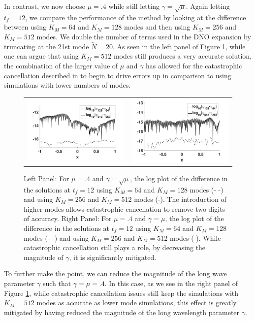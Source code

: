 \documentclass[a4paper,11pt]{article}
\begin{document}
In contrast, we now choose $\mu=.4$ while still letting $\gamma=\sqrt{\mu}$.  Again letting $t_{f} =12$, we compare the performance of the method by looking at the difference between using $K_{M}=64$ and $K_{M}=128$ modes and then using $K_{M}=256$ and $K_{M}=512$ modes.  We double the number of terms used in the DNO expansion by truncating at the 21st mode $\tilde{N}=20$.  As seen in the left panel of Figure \ref{fig:convcompfail}, while one can argue that using $K_{M}=512$  modes still produces a very accurate solution, the combination of the larger value of $\mu$ and $\gamma$ has allowed for the catastrophic cancellation described in \cite{wilkening} to begin to drive errors up in comparison to using simulations with lower numbers of modes.   
\begin{figure}[h]
\centering
\begin{tabular}{cc}
\includegraphics[width=.48\textwidth]{conv_plot_mupt4_tf_12} & \includegraphics[width=.48\textwidth]{conv_plot_mupt4_gampt4_tf_12}
\end{tabular}
\caption{ Left Panel: For $\mu=.4$ and $\gamma=\sqrt{\mu}$, the log plot of the difference in the solutions at $t_{f}=12$ using $K_{M}=64$ and $K_{M}=128$ modes (- -) and using $K_{M}=256$ and $K_{M}=512$ modes (-).  The introduction of higher modes allows catastrophic cancellation to remove two digits of accuracy. Right Panel: For $\mu=.4$ and $\gamma=\mu$, the log plot of the difference in the solutions at $t_{f}=12$ using $K_{M}=64$ and $K_{M}=128$ modes (- -) and using $K_{M}=256$ and $K_{M}=512$ modes (-). While catastrophic cancellation still plays a role, by decreasing the magnitude of $\gamma$, it is significantly mitigated.}
\label{fig:convcompfail}
\end{figure}
To further make the point, we can reduce the magnitude of the long wave parameter $\gamma$ such that $\gamma=\mu=.4$.  In this case, as we see in the right panel of Figure \ref{fig:convcompfail}, while catastrophic cancellation issues still keep the simulations with $K_{M}=512$ modes as accurate as lower mode simulations, this effect is greatly mitigated by having reduced the magnitude of the long wavelength parameter $\gamma$.
\end{document}
